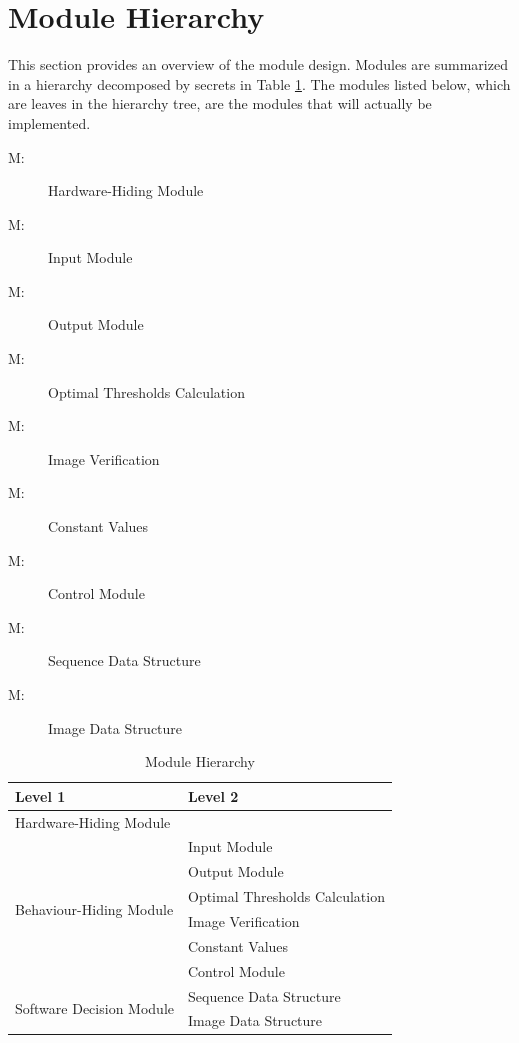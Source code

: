 \documentclass[12pt, titlepage]{article}
\newcounter{mnum}
\newcommand{\mthemnum}{M\themnum}
\begin{document}
\section{Module Hierarchy} \label{SecMH}

This section provides an overview of the module design. Modules are summarized
in a hierarchy decomposed by secrets in Table \ref{TblMH}. The modules listed
below, which are leaves in the hierarchy tree, are the modules that will
actually be implemented.

\begin{description}
\item [ \mthemnum \label{mHH}:] Hardware-Hiding Module
\item [ \mthemnum \label{mInput}:]
Input Module
\item [ \mthemnum \label{mOutput}:]
Output Module
\item [ \mthemnum \label{mCalculation}:]
Optimal Thresholds Calculation
\item [ \mthemnum \label{mVerify}:]
Image Verification
\item [ \mthemnum \label{mConstants}:]
Constant Values
\item [ \mthemnum \label{mControl}:]
Control Module
\item [ \mthemnum \label{mSequenceDS}:]
Sequence Data Structure
\item [ \mthemnum \label{mImageDS}:]
Image Data Structure
\end{description}


\begin{table}[h!]
\centering
\begin{tabular}{p{} p{}}
\toprule
\textbf{Level 1} & \textbf{Level 2}\\
\midrule

{Hardware-Hiding Module} & ~ \\
\midrule

\multirow{6}{0.3\textwidth}{Behaviour-Hiding Module}
& Input Module\\
& Output Module\\
& Optimal Thresholds Calculation\\
& Image Verification\\
& Constant Values\\
& Control Module\\
\midrule

\multirow{2}{0.3\textwidth}{Software Decision Module}
& Sequence Data Structure\\
& Image Data Structure\\
\bottomrule

\end{tabular}
\caption{Module Hierarchy}
\label{TblMH}
\end{table}
\end{document}
